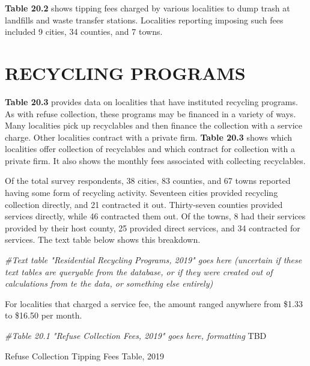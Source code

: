 \documentclass[
]{book}
\newenvironment{Shaded}{\begin{snugshade}}{\end{snugshade}}
\newcommand{\AlertTok}[1]{\textcolor[rgb]{0.94,0.16,0.16}{#1}}
\newcommand{\CommentTok}[1]{\textcolor[rgb]{0.56,0.35,0.01}{\textit{#1}}}
\begin{document}
\textbf{Table 20.2} shows tipping fees charged by various localities to dump trash at landfills and waste transfer stations. Localities reporting imposing such fees included 9 cities, 34 counties, and 7 towns.

\hypertarget{recycling-programs}{%
\section{RECYCLING PROGRAMS}\label{recycling-programs}}

\textbf{Table 20.3} provides data on localities that have instituted recycling programs. As with refuse collection, these programs may be financed in a variety of ways. Many localities pick up recyclables and then finance the collection with a service charge. Other localities contract with a private firm. \textbf{Table 20.3} shows which localities offer collection of recyclables and which contract for collection with a private firm. It also shows the monthly fees associated with collecting recyclables.

Of the total survey respondents, 38 cities, 83 counties, and 67 towns reported having some form of recycling activity. Seventeen cities provided recycling collection directly, and 21 contracted it out. Thirty-seven counties provided services directly, while 46 contracted them out. Of the towns, 8 had their services provided by their host county, 25 provided direct services, and 34 contracted for services. The text table below shows this breakdown.

\begin{Shaded}
\begin{Highlighting}[]
\CommentTok{\#Text table "Residential Recycling Programs, 2019" goes here (uncertain if these text tables are queryable from the database, or if they were created out of calculations from te the data, or something else entirely)}
\end{Highlighting}
\end{Shaded}

For localities that charged a service fee, the amount ranged anywhere from \$1.33 to \$16.50 per month.

\begin{Shaded}
\begin{Highlighting}[]
\CommentTok{\#Table 20.1 "Refuse Collection Fees, 2019" goes here, formatting }\AlertTok{TBD}
\end{Highlighting}
\end{Shaded}

\label{tab:table20-2}Refuse Collection Tipping Fees Table, 2019
\end{document}
